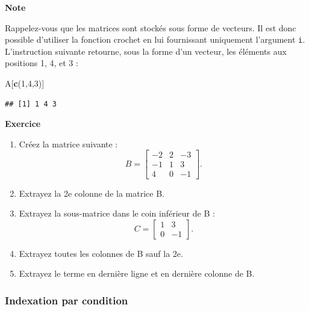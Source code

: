 \documentclass[
  11pt,
]{book}
\newenvironment{Shaded}{\begin{snugshade}}{\end{snugshade}}
\newcommand{\DecValTok}[1]{\textcolor[rgb]{0.00,0.00,0.81}{#1}}
\newcommand{\FunctionTok}[1]{\textcolor[rgb]{0.13,0.29,0.53}{\textbf{#1}}}
\newcommand{\NormalTok}[1]{#1}
\providecommand{\tightlist}{%
  \setlength{\itemsep}{0pt}\setlength{\parskip}{0pt}}
\numberwithin{equation}{section}
\numberwithin{countremarque}{section}
\newenvironment{notebox}{
  \begin{tcolorbox}[breakable, colback=jaune,coltext=black,
                  colframe=grisfonce]}
 {\end{tcolorbox}}
\newenvironment{greenbox}{
  \begin{tcolorbox}[breakable, colback=vert,coltext=black,
                  colframe=grisfonce]}
 {\end{tcolorbox}}
\begin{document}
\begin{notebox}

\textbf{Note}

Rappelez-vous que les matrices sont stockés sous forme de vecteurs. Il est donc possible d'utiliser la fonction crochet en lui fournissant uniquement l'argument \texttt{i}. L'instruction suivante retourne, sous la forme d'un vecteur, les éléments aux positions 1, 4, et 3 :

\begin{Shaded}
\begin{Highlighting}[]
\NormalTok{A[}\FunctionTok{c}\NormalTok{(}\DecValTok{1}\NormalTok{,}\DecValTok{4}\NormalTok{,}\DecValTok{3}\NormalTok{)]}
\end{Highlighting}
\end{Shaded}

\begin{lstlisting}
## [1] 1 4 3
\end{lstlisting}

\end{notebox}

\begin{greenbox}

\textbf{Exercice}

\begin{enumerate}
\def\labelenumi{\arabic{enumi}.}
\tightlist
\item
  Créez la matrice suivante : \[B = \begin{bmatrix}-2 & 2 & -3 \\ -1 & 1 & 3\\4 & 0 & -1\end{bmatrix}.\]
\item
  Extrayez la 2e colonne de la matrice B.
\item
  Extrayez la sous-matrice dans le coin inférieur de B : \[C=\begin{bmatrix}1 & 3 \\ 0 & -1\end{bmatrix}.\]
\item
  Extrayez toutes les colonnes de B sauf la 2e.
\item
  Extrayez le terme en dernière ligne et en dernière colonne de B.
\end{enumerate}

\end{greenbox}

\hypertarget{indexation-par-condition-1}{%
\subsubsection{Indexation par condition}\label{indexation-par-condition-1}}
\end{document}
